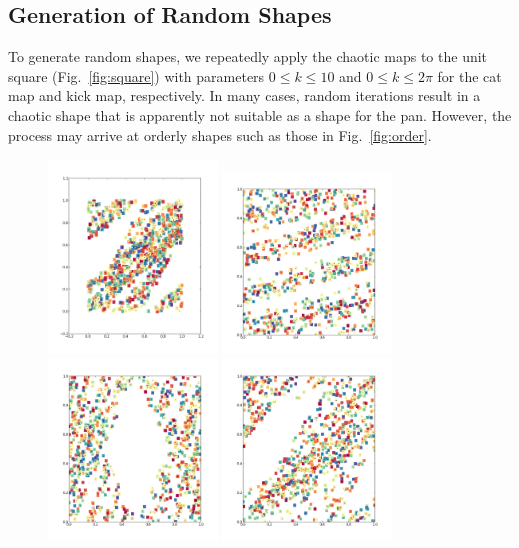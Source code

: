\documentclass[12pt]{reedmcm}
\begin{document}
\subsection{Generation of Random Shapes}
To generate random shapes, we repeatedly apply the chaotic maps to the unit square (Fig.~\ref{fig:square}) with parameters $0 \leq k \leq 10$ and $0 \leq k \leq 2\pi$ for the cat map and kick map, respectively.
In many cases, random iterations result in a chaotic shape that is apparently not suitable as a shape for the pan. 
However, the process may arrive at orderly shapes such as those in Fig.~\ref{fig:order}.
\begin{figure}[h!]
  \centering
  \includegraphics[width=0.4\textwidth]{random2}
  \includegraphics[width=0.4\textwidth]{random128}
  \includegraphics[width=0.4\textwidth]{random256}
  \includegraphics[width=0.4\textwidth]{random1280}

\end{figure}
\end{document}
